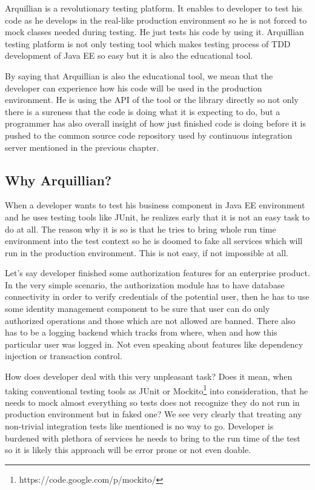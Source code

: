 \documentclass[12pt,final,oneside]{fithesis}
\begin{document}
Arquillian is a revolutionary testing platform. It enables to developer to test his code as he develops in the real-like production environment so he is not forced to mock classes needed during testing. He just tests his code by using it. Arquillian testing platform is not only testing tool which makes testing process of TDD development of Java EE so easy but it is also the educational tool.

By saying that Arquillian is also the educational tool, we mean that the developer can experience how his code will be used in the production environment. He is using the API of the tool or the library directly so not only there is a sureness that the code is doing what it is expecting to do, but a programmer has also overall insight of how just finished code is doing before it is pushed to the common source code repository used by continuous integration server mentioned in the previous chapter.

	\subsection{Why Arquillian?}

When a developer wants to test his business component in Java EE environment and he uses testing tools like JUnit, he realizes early that it is not an easy task to do at all\cite{bib071}. The reason why it is so is that he tries to bring whole run time environment into the test context so he is doomed to fake all services which will run in the production environment. This is not easy, if not impossible at all.

Let's say developer finished some authorization features for an enterprise product. In the very simple scenario, the authorization module has to have database connectivity in order to verify credentials of the potential user, then he has to use some identity management component to be sure that user can do only authorized operations and those which are not allowed are banned. There also has to be a logging backend which tracks from where, when and how this particular user was logged in. Not even speaking about features like dependency injection or transaction control.

How does developer deal with this very unpleasant task? Does it mean, when taking conventional testing tools as JUnit or Mockito\footnote{https://code.google.com/p/mockito/} into consideration, that he needs to mock almost everything so tests does not recognize they do not run in production environment but in faked one? We see very clearly that treating any non-trivial integration tests like mentioned is no way to go. Developer is burdened with plethora of services he needs to bring to the run time of the test so it is likely this approach will be error prone or not even doable.
	
\end{document}
